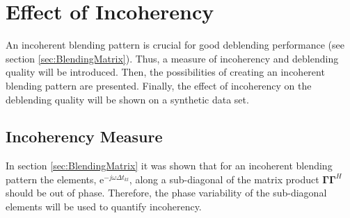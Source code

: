 \FloatBarrier

\section{Effect of Incoherency}

An incoherent blending pattern is crucial for good deblending performance (see section \ref{sec:BlendingMatrix}). Thus, a measure of incoherency and deblending quality will be introduced. Then, the possibilities of creating an incoherent blending pattern are presented. Finally, the effect of incoherency on the deblending quality will be shown on a synthetic data set.


\subsection*{Incoherency Measure}



In section \ref{sec:BlendingMatrix} it was shown that for an incoherent blending pattern the elements, $\mathrm{e}^{-j \omega \Delta t_{kl}}$, along a sub-diagonal of the matrix product $\mathbf{\Gamma \Gamma}^H$ should be out of phase. Therefore, the phase variability of the sub-diagonal elements will be used to quantify incoherency. 

